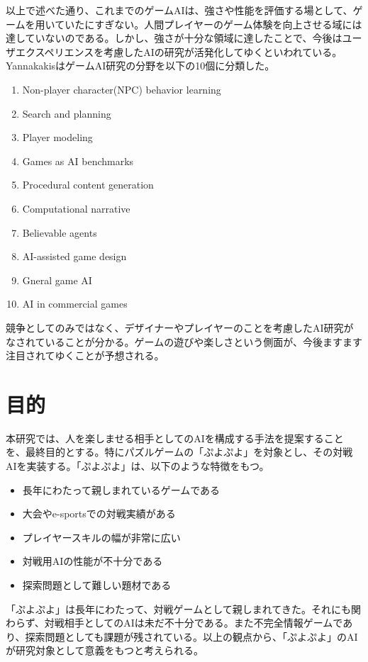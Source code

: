 \documentclass[12pt]{jsarticle}
\begin{document}
以上で述べた通り、これまでのゲームAIは、強さや性能を評価する場として、ゲームを用いていたにすぎない。人間プレイヤーのゲーム体験を向上させる域には達していないのである。しかし、強さが十分な領域に達したことで、今後はユーザエクスペリエンスを考慮したAIの研究が活発化してゆくといわれている\cite{miyake_genzai, ikeda}。YannakakisはゲームAI研究の分野を以下の10個に分類した\cite{yan_panorama}。
\begin{enumerate}
\item Non-player character(NPC) behavior learning
\item Search and planning
\item Player modeling
\item Games as AI benchmarks
\item Procedural content generation
\item Computational narrative
\item Believable agents
\item AI-assisted game design
\item Gneral game AI
\item AI in commercial games
\end{enumerate}
競争としてのみではなく、デザイナーやプレイヤーのことを考慮したAI研究がなされていることが分かる。ゲームの遊びや楽しさという側面が、今後ますます注目されてゆくことが予想される。


\section{目的}
本研究では、人を楽しませる相手としてのAIを構成する手法を提案することを、最終目的とする。特にパズルゲームの「ぷよぷよ」を対象とし、その対戦AIを実装する。「ぷよぷよ」は、以下のような特徴をもつ。
\begin{itemize}
\item 長年にわたって親しまれているゲームである
\item 大会やe-sportsでの対戦実績がある
\item プレイヤースキルの幅が非常に広い
\item 対戦用AIの性能が不十分である
\item 探索問題として難しい題材である
\end{itemize}
「ぷよぷよ」は長年にわたって、対戦ゲームとして親しまれてきた。それにも関わらず、対戦相手としてのAIは未だ不十分である。また不完全情報ゲームであり、探索問題としても課題が残されている。以上の観点から、「ぷよぷよ」のAIが研究対象として意義をもつと考えられる。
\end{document}
